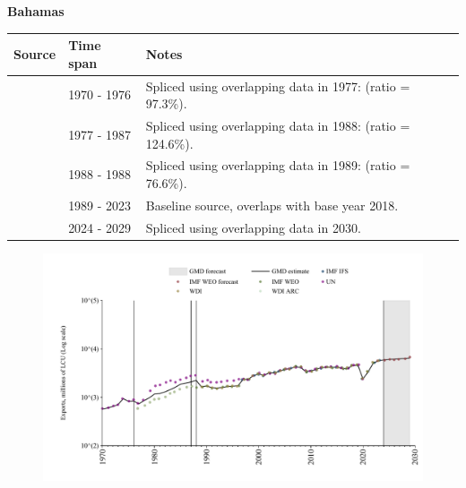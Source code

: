 \documentclass[12pt,a4paper,landscape]{article}
\begin{document}
\begin{adjustbox}{max totalsize={\paperwidth}{\paperheight},center}
\begin{minipage}[t][\textheight][t]{\textwidth}
\vspace*{0.5cm}
{}
\begin{center}
{\Large\bfseries Bahamas}
\end{center}
\vspace{0.5cm}
\begin{table}[H]
\centering
\small
\begin{tabular}{|l|l|l|}
\hline
\textbf{Source} & \textbf{Time span} & \textbf{Notes} \\
\hline
\rowcolor{white}\cite{UN}& 1970 - 1976 &Spliced using overlapping data in 1977: (ratio = 97.3\%).\\
\rowcolor{lightgray}\cite{WDI}& 1977 - 1987 &Spliced using overlapping data in 1988: (ratio = 124.6\%).\\
\rowcolor{white}\cite{UN}& 1988 - 1988 &Spliced using overlapping data in 1989: (ratio = 76.6\%).\\
\rowcolor{lightgray}\cite{WDI}& 1989 - 2023 &Baseline source, overlaps with base year 2018.\\
\rowcolor{white}\cite{IMF_WEO_forecast}& 2024 - 2029 &Spliced using overlapping data in 2030.\\
\hline
\end{tabular}
\end{table}
\begin{figure}[H]
\centering
\includegraphics[width=\textwidth,height=0.6\textheight,keepaspectratio]{graphs/BHS_exports.pdf}
\end{figure}
\end{minipage}
\end{adjustbox}
\end{document}

